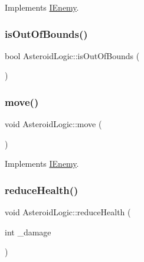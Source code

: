 Implements \hyperlink{class_i_enemy_a3e44ca5e5fabcfd71b26657eba26e5a2}{I\+Enemy}.

\mbox{\label{class_asteroid_logic_ad2fadce802b18aa2d57baee65a56833e}} 
\subsubsection{\texorpdfstring{is\+Out\+Of\+Bounds()}{isOutOfBounds()}}
{\footnotesize\ttfamily bool Asteroid\+Logic\+::is\+Out\+Of\+Bounds (\begin{DoxyParamCaption}{ }\end{DoxyParamCaption})}

\mbox{\label{class_asteroid_logic_af20b202c4f5857279192733a0b2fdbd3}} 
\subsubsection{\texorpdfstring{move()}{move()}}
{\footnotesize\ttfamily void Asteroid\+Logic\+::move (\begin{DoxyParamCaption}{ }\end{DoxyParamCaption})\hspace{0.3cm}{\ttfamily [virtual]}}



Implements \hyperlink{class_i_enemy_a0dbed8e8e15436305b6ede08b618c232}{I\+Enemy}.

\mbox{\label{class_asteroid_logic_a54519e4b2719c70d17f5a28bb0d8fb56}} 
\subsubsection{\texorpdfstring{reduce\+Health()}{reduceHealth()}}
{\footnotesize\ttfamily void Asteroid\+Logic\+::reduce\+Health (\begin{DoxyParamCaption}\item[{int}]{\+\_\+damage }\end{DoxyParamCaption})\hspace{0.3cm}{\ttfamily [virtual]}}



